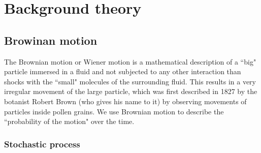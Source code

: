 \chapter{Background theory}
\section{Browinan motion}

The Brownian motion or Wiener motion is a mathematical description of a ``big" particle immersed in a fluid and not subjected to any other interaction than shocks with the ``small" molecules of the surrounding fluid. This results in a very irregular movement of the large particle, which was first described in 1827 by the botanist Robert Brown (who gives his name to it) by observing movements of particles inside pollen grains. We use Brownian motion to describe the ``probability of the motion" over the time.

\subsection{Stochastic process}

